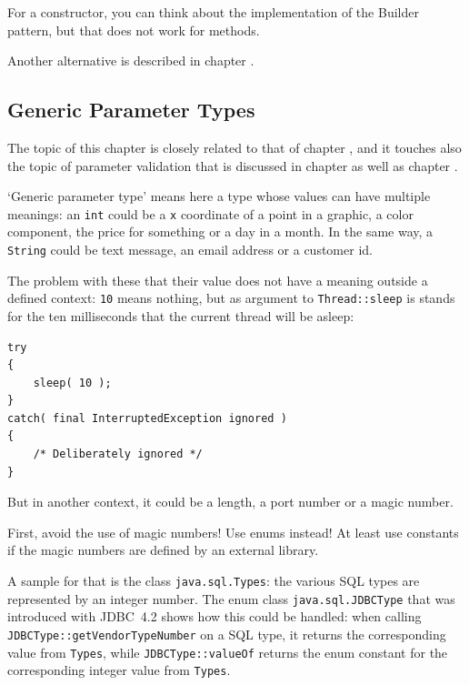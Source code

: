 For a constructor, you can think about the implementation of the Builder pattern\autocite{Gamma:DesignPatterns}, but that does not work for methods.

Another alternative is described in chapter .


\subsection{Generic Parameter Types}\label{sec:GenericParameterTypes}
The topic of this chapter is closely related to that of chapter , and it touches also the topic of parameter validation that is discussed in chapter  as well as chapter .

‘Generic parameter type’ means here a type whose values can have multiple meanings: an \lstinline|int| could be a \verb#x# coordinate of a point in a graphic, a color component, the price for something or a day in a month. In the same way, a \lstinline|String| could be text message, an email address or a customer id.

The problem with these that their value does not have a meaning outside a defined context: \lstinline|10| means nothing, but as argument to \lstinline|Thread::sleep|\autocite{ORACLE_DOC_THREAD:sleep} is stands for the ten milliseconds that the current thread will be asleep:
\begin{lstlisting}
try
{
    sleep( 10 );
}
catch( final InterruptedException ignored )
{
    /* Deliberately ignored */
}    
\end{lstlisting}
But in another context, it could be a length, a port number or a magic number.

First, avoid the use of magic numbers! Use enums instead! At least use constants if the magic numbers are defined by an external library.

A sample for that is the class \lstinline|java.sql.Types|\autocite{ORACLE_DOC_TYPES_CLASS}: the various SQL types are represented by an integer number. The enum class \lstinline|java.sql.JDBCType|\autocite{ORACLE_DOC_JDBCTYPE_ENUM} that was introduced with JDBC~4.2 \autocite{ORACLE_DOC_SQL_PACKAGE,WIKIPEDIA:JDBC,DEV_TO:JDBC} shows how this could be handled: when calling \lstinline|JDBCType::getVendorTypeNumber|\autocite{ORACLE_DOC_JDBCTYPE:getVendorTypeNumber} on a SQL type, it returns the corresponding value from \lstinline|Types|, while \lstinline|JDBCType::valueOf|\autocite{ORACLE_DOC_JDBCTYPE:valueOf} returns the enum constant for the corresponding integer value from \lstinline|Types|.

